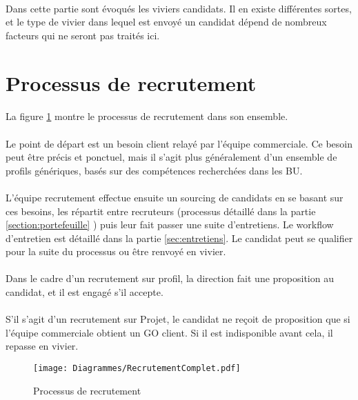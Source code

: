  \paragraph{} Dans cette partie sont évoqués les viviers candidats. Il en existe différentes sortes, et le type de vivier dans lequel est envoyé un candidat dépend de nombreux facteurs qui ne seront pas traités ici.

 \section{Processus de recrutement}

\paragraph{} La figure \ref{recrutementFull} montre le processus de recrutement dans son ensemble.
\paragraph{} Le point de départ est un besoin client relayé par l'équipe commerciale. Ce besoin peut être précis et ponctuel, mais il s'agit plus généralement d'un ensemble de profils génériques, basés sur des compétences recherchées dans les BU.
\paragraph{} L'équipe recrutement effectue ensuite un sourcing de candidats en se basant sur ces besoins, les répartit entre recruteurs (processus détaillé dans la partie \ref{section:portefeuille} ) puis leur fait passer une suite d'entretiens. Le workflow d'entretien est détaillé dans la partie \ref{sec:entretiens}. Le candidat peut se qualifier pour la suite du processus ou être renvoyé en vivier.
\paragraph{} Dans le cadre d'un recrutement sur profil, la direction fait une proposition au candidat, et il est engagé s'il accepte.
\paragraph{} S'il s'agit d'un recrutement sur Projet, le candidat ne reçoit de proposition que si l'équipe commerciale obtient un GO client. Si il est indisponible avant cela, il repasse en vivier.

\begin{figure}
	\centering
	\begin{sideways}
	\texttt{[image: Diagrammes/RecrutementComplet.pdf]}
	\end{sideways}
	\caption{Processus de recrutement}
	\label{recrutementFull}	
\end{figure}

